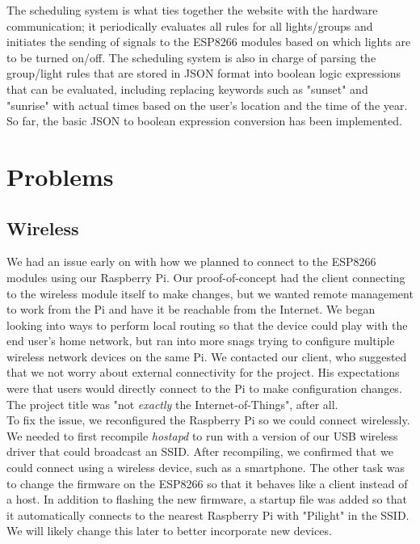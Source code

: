 \documentclass[10pt,draftclsnofoot,onecolumn]{IEEEtran}
\begin{document}
The scheduling system is what ties together the website with the hardware
communication; it periodically evaluates all rules for all lights/groups and
initiates the sending of signals to the ESP8266 modules based on which lights
are to be turned on/off.  The scheduling system is also in charge of parsing
the group/light rules that are stored in JSON format into boolean logic
expressions that can be evaluated, including replacing keywords such as
"sunset" and "sunrise" with actual times based on the user's location and the
time of the year.  So far, the basic JSON to boolean expression conversion has
been implemented.

\section{Problems}

\subsection{Wireless}

We had an issue early on with how we planned to connect to the ESP8266 modules
using our Raspberry Pi. Our proof-of-concept had the client connecting to the
wireless module itself to make changes, but we wanted remote management to work
from the Pi and have it be reachable from the Internet. We began looking into
ways to perform local routing so that the device could play with the end user's
home network, but ran into more snags trying to configure multiple wireless
network devices on the same Pi. We contacted our client, who suggested that we
not worry about external connectivity for the project. His expectations were
that users would directly connect to the Pi to make configuration changes. The
project title was "not \textit{exactly} the Internet-of-Things", after all.\\

To fix the issue, we reconfigured the Raspberry Pi so we could connect
wirelessly. We needed to first recompile \textit{hostapd} to run with a version
of our USB wireless driver that could broadcast an SSID. After recompiling, we
confirmed that we could connect using a wireless device, such as a smartphone.
The other task was to change the firmware on the ESP8266 so that it behaves
like a client instead of a host. In addition to flashing the new firmware, a
startup file was added so that it automatically connects to the nearest
Raspberry Pi with "Pilight" in the SSID. We will likely change this later to
better incorporate new devices.
\end{document}
